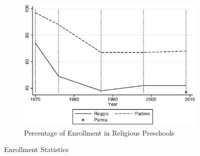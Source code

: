 \begin{figure}[H]
\begin{subfigure}[ht]{0.48\textwidth}
        \includegraphics[width=\textwidth]{../../output/image/enroll_per_priv_graph.eps}
        \caption{Percentage of Enrollment in Religious Preschools}
        \label{fig:large}
      \end{subfigure}
      \caption{Enrollment Statistics}  \label{fig:enrollment}
    \end{figure}    